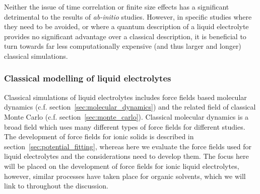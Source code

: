 \documentclass[../main.tex]{subfiles}
\begin{document}
Neither the issue of time correlation or finite size effects has a significant detrimental to the results of \textit{ab-initio} studies. However, in specific studies where they need to be avoided, or where a quantum description of a liquid electrolyte provides no significant advantage over a classical description, it is beneficial to turn towards far less computationally expensive (and thus larger and longer) classical simulations.

\subsubsection{Classical modelling of liquid electrolytes}
Classical simulations of liquid electrolytes includes force fields based molecular dynamics (c.f. section~\ref{sec:molecular_dynamics}) and the related field of classical Monte Carlo (c.f. section~\ref{sec:monte_carlo}). %
Classical molecular dynamics is a broad field which uses many different types of force fields for different studies. The development of force fields for ionic solids is described in section~\ref{sec:potential_fitting}, whereas here we evaluate the force fields used for liquid electrolytes and the considerations need to develop them. The focus here will be placed on the development of force fields for ionic liquid electrolytes, however, similar processes have taken place for organic solvents, which we will link to throughout the discussion.
\end{document}
